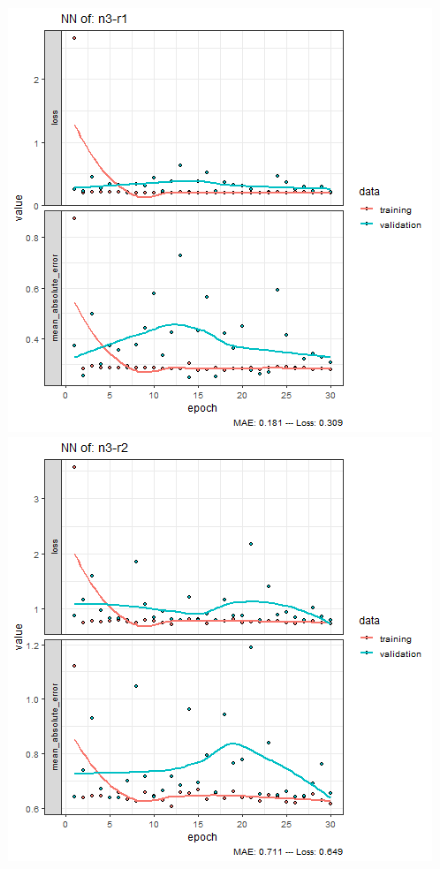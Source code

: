 \documentclass{FR16}
\begin{document}
\begin{figure}[!htb]
\begin{minipage}{0.33\textwidth}
   \end{minipage}\hfill
\begin{minipage}{0.33\textwidth}
     \centering
     \includegraphics[width=1\linewidth]{figures/NN-n3-r1.png} 
   \end{minipage}\hfill
   \begin{minipage}{0.33\textwidth}
     \centering
     \includegraphics[width=1\linewidth]{figures/NN-n3-r2.png}

\end{minipage}
\end{figure}
\end{document}
